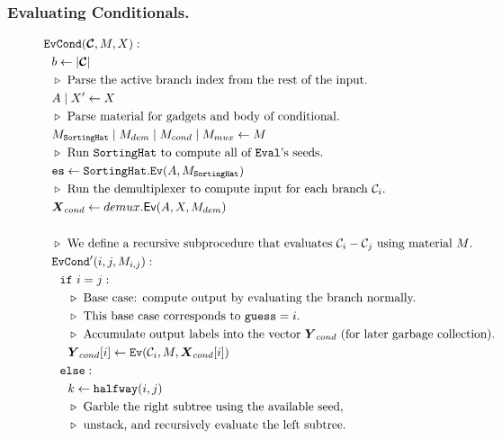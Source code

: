 \subsubsection{Evaluating Conditionals.}

\begin{figure}
  \begin{align*}
    &\evcond(\vec{\cir}, \mat, X):\\
    &~~b \gets | \vec{\cir} |\\
    &~~\codecomment{Parse the active branch index from the rest of the
    input.}\\
    &~~\aid \mid X' \gets X\\
    &~~\codecomment{Parse material for gadgets and body of conditional.}\\
    &~~\mat_\gadget \mid \mat_{dem} \mid \mat_{cond} \mid \mat_{mux} \gets \mat\\
    &~~\codecomment{Run $\gadget$ to compute all of \E's seeds.}\\
    &~~\es \gets \gadget.\mathtt{Ev}(\aid, \mat_\gadget)\\
    &~~\codecomment{Run the demultiplexer to compute input for each
    branch $\cir_i$.}\\
    &~~\vec{X}_{cond} \gets \evdem(\aid, X, \mat_{dem})\\
    \\
    &~~\codecomment{We define a recursive subprocedure that evaluates $\cir_i - \cir_j$ using material $\mat$.}\\
    &~~\evcond'(i, j, \mat_{i, j}):\\
    &~~~~\cif~i = j:\\
    &~~~~~~\codecomment{Base case: compute output by evaluating the branch normally.}\\
    &~~~~~~\codecomment{This base case corresponds to $\guess = i$.}\\
    &~~~~~~\codecomment{Accumulate output labels into the vector
    $\gcirout_{cond}$ (for later garbage collection).}\\
    &~~~~~~\gcirout_{cond}[i] \gets \ev(\cir_i, M, \gcirinp_{cond}[i])\\
    &~~~~\celse:\\
    &~~~~~~k \gets \halfway(i, j)\\
    &~~~~~~\codecomment{Garble the right subtree using the available
    seed,}\\
    &~~~~~~\codecomment{unstack, and recursively evaluate the left
    subtree.}\\

\end{align*}
\end{figure}
